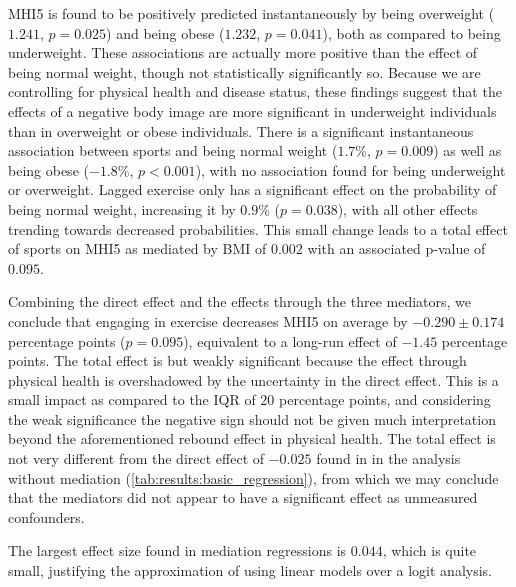 MHI5 is found to be positively predicted instantaneously by being overweight ($1.241$, $p = 0.025$) and
being obese ($1.232$, $p = 0.041$), both as compared to being underweight. These associations are actually more positive
than the effect of being normal weight, though not statistically significantly so.
Because we are controlling for physical health and disease status, these findings suggest that the effects of a negative
body image are more significant in underweight individuals than in overweight or obese individuals.
There is a significant instantaneous association between sports and being normal weight ($1.7\%$, $p = 0.009$)
as well as being obese ($-1.8\%$, $p < 0.001$), with no association found for being underweight or overweight.
Lagged exercise only has a significant effect on the probability of being normal weight, increasing it by $0.9\%$ ($p = 0.038$),
with all other effects trending towards decreased probabilities.
This small change leads to a total effect of sports on MHI5 as mediated by BMI of $0.002$ with an associated p-value of $0.095$.

Combining the direct effect and the effects through the three mediators, we conclude that engaging in exercise decreases
MHI5 on average by $-0.290 \pm 0.174$ percentage points ($p = 0.095$), equivalent to a long-run effect of $-1.45$
percentage points.
The total effect is but weakly significant because the effect through physical health is overshadowed by the uncertainty
in the direct effect.
This is a small impact as compared to the IQR of $20$ percentage points, and considering the weak significance
the negative sign should not be given much interpretation beyond the aforementioned rebound effect in physical health.
The total effect is not very different from the direct effect of $-0.025$ found in in the analysis without mediation
(\cref{tab:results:basic_regression}), from which we may conclude that the mediators did not appear to have a significant
effect as unmeasured confounders.

The largest effect size found in mediation regressions is $0.044$, which is quite small, justifying the approximation
of using linear models over a logit analysis.


